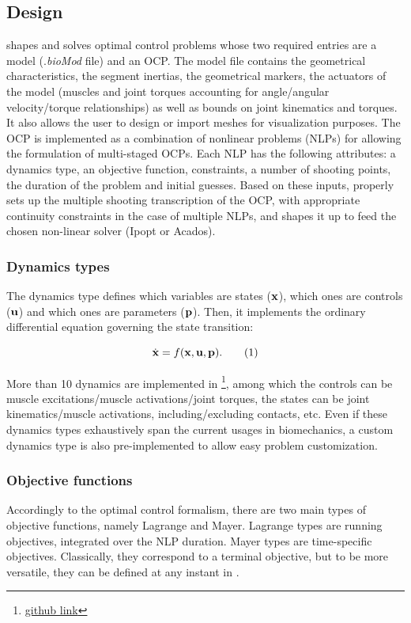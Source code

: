 \subsection{Design}
\bioptim shapes and solves optimal control problems whose two required entries are a model (.\textit{bioMod} file) and an OCP.
The model file contains the geometrical characteristics, the segment inertias, the geometrical markers, the actuators of the model (muscles and joint torques accounting for angle/angular velocity/torque relationships) as well as bounds on joint kinematics and torques. 
It also allows the user to design or import meshes for visualization purposes.
The OCP is implemented as a combination of nonlinear problems (NLPs) for allowing the formulation of multi-staged OCPs. Each NLP has the following attributes: a dynamics type, an objective function, constraints, a number of shooting points, the duration of the problem and initial guesses.
Based on these inputs, \bioptim properly sets up the multiple shooting transcription of the OCP, with appropriate continuity constraints in the case of multiple NLPs, and shapes it up to feed the chosen non-linear solver (Ipopt or Acados). 

\subsubsection{Dynamics types}
The dynamics type defines which variables are states ($\mathbf{x}$), which ones are controls ($\mathbf{u}$) and which ones are parameters ($\mathbf{p}$).
Then, it implements the ordinary differential equation governing the state transition:

\[
\dstate = f(\state, \control, \param).
\addtag
\label{eq:state_transition}
\]

\noindent More than 10 dynamics are implemented in \bioptim \footnote{\href{https://github.com/pyomeca/bioptim/blob/master/bioptim/dynamics/dynamics_functions.py}{github link}}, among which the controls can be muscle excitations/muscle activations/joint torques, the states can be joint kinematics/muscle activations, including/excluding contacts, etc.
Even if these dynamics types exhaustively span the current usages in biomechanics, a custom dynamics type is also pre-implemented to allow easy problem customization.

\subsubsection{Objective functions}
Accordingly to the optimal control formalism, there are two main types of objective functions, namely Lagrange and Mayer. Lagrange types are running objectives, integrated over the NLP duration. Mayer types are time-specific objectives. Classically, they correspond to a terminal objective, but to be more versatile, they can be defined at any instant in \bioptim.

